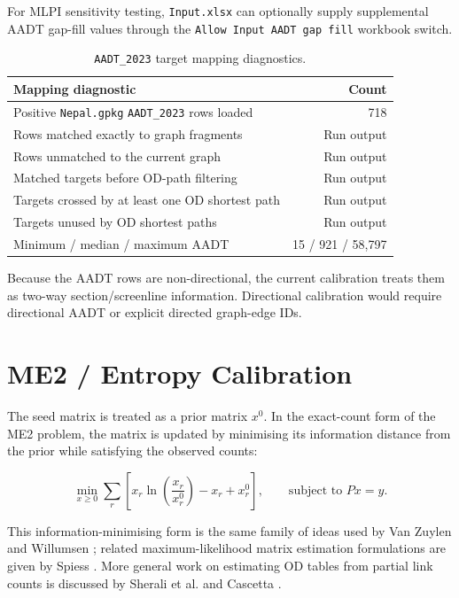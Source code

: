 \documentclass[11pt,a4paper]{article}
\begin{document}
For MLPI sensitivity testing, \texttt{Input.xlsx} can optionally supply
supplemental AADT gap-fill values through the
\texttt{Allow Input AADT gap fill} workbook switch.

\begin{table}[H]
\centering
\caption{\texttt{AADT\_2023} target mapping diagnostics.}
\begin{tabular}{lr}
\toprule
\textbf{Mapping diagnostic} & \textbf{Count} \\
\midrule
Positive \texttt{Nepal.gpkg} \texttt{AADT\_2023} rows loaded & 718 \\
Rows matched exactly to graph fragments & Run output \\
Rows unmatched to the current graph & Run output \\
Matched targets before OD-path filtering & Run output \\
Targets crossed by at least one OD shortest path & Run output \\
Targets unused by OD shortest paths & Run output \\
Minimum / median / maximum AADT & 15 / 921 / 58,797 \\
\bottomrule
\end{tabular}
\end{table}

Because the AADT rows are non-directional, the current calibration treats them
as two-way section/screenline information. Directional calibration would require
directional AADT or explicit directed graph-edge IDs.

\section{ME2 / Entropy Calibration}

The seed matrix is treated as a prior matrix $x^0$. In the exact-count form of
the ME2 problem, the matrix is updated by minimising its information distance
from the prior while satisfying the observed counts:

\begin{equation}
\min_{x\geq0}
\sum_r
\left[
x_r\ln\left(\frac{x_r}{x^0_r}\right)-x_r+x^0_r
\right],
\qquad \text{subject to } Px=y.
\label{eq:entropy_objective}
\end{equation}

This information-minimising form is the same family of ideas used by Van
Zuylen and Willumsen \cite{vanzuylen1980}; related maximum-likelihood matrix
estimation formulations are given by Spiess \cite{spiess1987}. More general
work on estimating OD tables from partial link counts is discussed by Sherali
et al. \cite{sherali2003} and Cascetta \cite{cascetta1984}.
\end{document}
